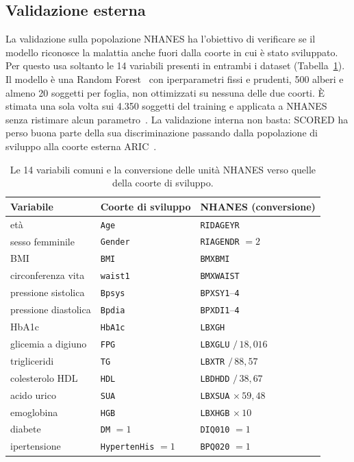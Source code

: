 \documentclass[a4paper, 12pt, oneside]{book}
\begin{document}
\subsection{Validazione esterna}

La validazione sulla popolazione NHANES ha l'obiettivo di verificare se il modello riconosce la malattia anche fuori dalla coorte in cui è stato sviluppato. Per questo usa soltanto le 14 variabili presenti in entrambi i dataset (Tabella~\ref{tab:variabili-comuni}). Il modello è una Random Forest~\cite{breiman_random_2001} con iperparametri fissi e prudenti, 500 alberi e almeno 20 soggetti per foglia, non ottimizzati su nessuna delle due coorti. È stimata una sola volta sui 4.350 soggetti del training e applicata a NHANES senza ristimare alcun parametro~\cite{ramspek_external_2021}. La validazione interna non basta: SCORED ha perso buona parte della sua discriminazione passando dalla popolazione di sviluppo alla coorte esterna ARIC~\cite{bang_screening_2007}.

\begin{table}[H]
	\centering
	\small
	\caption{Le 14 variabili comuni e la conversione delle unità NHANES verso quelle della coorte di sviluppo.}
	\label{tab:variabili-comuni}
	\begin{tabularx}{\textwidth}{@{}l l >{\raggedright\arraybackslash}X@{}}
		\toprule
		Variabile & Coorte di sviluppo & NHANES (conversione) \\
		\midrule
		età & \texttt{Age} & \texttt{RIDAGEYR} \\
		sesso femminile & \texttt{Gender} & \texttt{RIAGENDR} $=2$ \\
		BMI & \texttt{BMI} & \texttt{BMXBMI} \\
		circonferenza vita & \texttt{waist1} & \texttt{BMXWAIST} \\
		pressione sistolica & \texttt{Bpsys} & \texttt{BPXSY1}--\texttt{4} \\
		pressione diastolica & \texttt{Bpdia} & \texttt{BPXDI1}--\texttt{4} \\
		HbA1c & \texttt{HbA1c} & \texttt{LBXGH} \\
		glicemia a digiuno & \texttt{FPG} & \texttt{LBXGLU} $/\,18{,}016$ \\
		trigliceridi & \texttt{TG} & \texttt{LBXTR} $/\,88{,}57$ \\
		colesterolo HDL & \texttt{HDL} & \texttt{LBDHDD} $/\,38{,}67$ \\
		acido urico & \texttt{SUA} & \texttt{LBXSUA} $\times\,59{,}48$ \\
		emoglobina & \texttt{HGB} & \texttt{LBXHGB} $\times\,10$ \\
		diabete & \texttt{DM} $=1$ & \texttt{DIQ010} $=1$ \\
		ipertensione & \texttt{HypertenHis} $=1$ & \texttt{BPQ020} $=1$ \\
		\bottomrule
	\end{tabularx}
\end{table}
\end{document}
